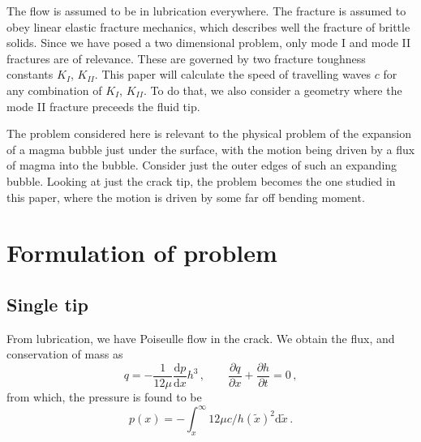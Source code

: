 \documentclass{jfm}
\newcommand{\mrd}{\mathrm{d}}
\begin{document}
The flow is assumed to be in lubrication everywhere. The fracture
is assumed to obey linear elastic fracture mechanics, which describes
well the fracture of brittle solids. Since we have posed a two dimensional
problem, only mode I and mode II fractures are of relevance. These are governed
by two fracture toughness constants $K_I$, $K_{II}$. This paper will calculate
the speed of travelling waves $c$ for any combination of $K_I$, $K_{II}$.
To do that, we also consider a geometry where the mode II fracture preceeds 
the fluid tip. 

The problem considered here is relevant to the physical problem of the 
expansion of a magma bubble just under the surface, 
with the motion being driven by a flux of magma into the bubble.
Consider just the outer edges of such an expanding bubble. Looking at just
the crack tip, the problem becomes the one studied in this paper, where the
motion is driven by some far off bending moment.


%
% 
\section{Formulation of problem}\label{sec:formulation_of_problem}
%
%
\subsection{Single tip}
From lubrication, we have Poiseulle flow in the crack. We obtain
the flux, and conservation of mass as 
\begin{equation}
q = - \frac{1}{12\mu}\frac{\mrd p}{\mrd x}h^3 \, , \qquad
\frac{\partial q}{\partial x} + \frac{\partial h}{\partial t} = 0 \, ,
\end{equation}
from which, the pressure is found to be
\begin{equation}
p(x) = -\int_x^{\infty} 12\mu c / h(\tilde{x})^2 \mrd \tilde{x} \, .
\end{equation}
\end{document}
